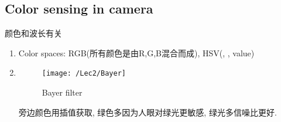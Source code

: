 \subsection{Color sensing in camera}
颜色和波长有关
\begin{enumerate}
    \item Color spaces: RGB(所有颜色是由R,G,B混合而成), HSV(, , value)
    \item {}
    \begin{figure}[H]
        \centering
        \texttt{[image: /Lec2/Bayer]}
        \caption{Bayer filter}
    \end{figure}
    旁边颜色用插值获取, 绿色多因为人眼对绿光更敏感, 绿光多信噪比更好. 
\end{enumerate}

